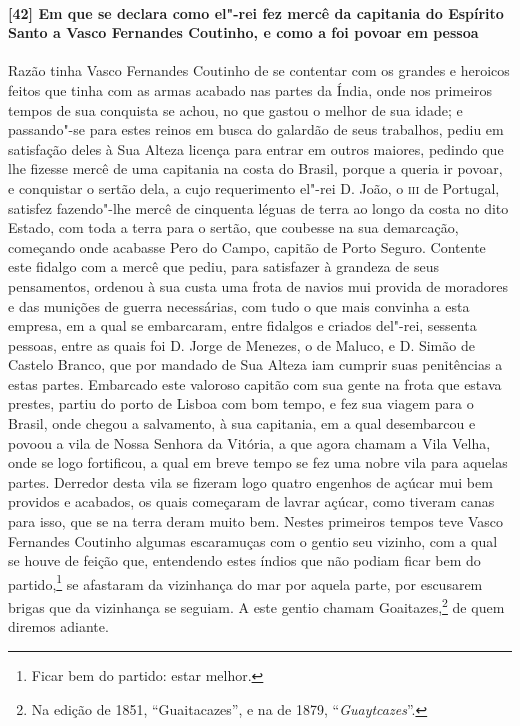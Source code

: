\begin{linenumbers}
\paragraph{[42] Em que se declara como el"-rei fez mercê da capitania do Espírito Santo a
Vasco Fernandes Coutinho, e como a foi povoar em pessoa} \quad
Razão tinha Vasco Fernandes Coutinho de se contentar com os grandes e heroicos feitos que
tinha com as armas acabado nas partes da Índia, onde nos primeiros tempos de sua conquista
se achou, no que gastou o melhor de sua idade; e passando"-se para estes reinos em busca do
galardão de seus trabalhos, pediu em satisfação deles à Sua Alteza licença para entrar em
outros maiores, pedindo que lhe fizesse mercê de uma capitania na costa do Brasil, porque
a queria ir povoar, e conquistar o sertão dela, a cujo requerimento el"-rei D. João, o
\textsc{iii} de Portugal, satisfez fazendo"-lhe mercê de cinquenta léguas de terra ao longo
da costa no dito Estado, com toda a terra para o sertão, que coubesse na sua demarcação,
começando onde acabasse Pero do Campo, capitão de Porto Seguro. Contente este fidalgo com
a mercê que pediu, para satisfazer à grandeza de seus pensamentos, ordenou à sua custa uma
frota de navios mui provida de moradores e das munições de guerra necessárias, com tudo o
que mais convinha a esta empresa, em a qual se embarcaram, entre fidalgos e criados
del"-rei, sessenta pessoas, entre as quais foi D. Jorge de Menezes, o de Maluco, e D. Simão
de Castelo Branco, que por mandado de Sua Alteza iam cumprir suas penitências a estas
partes. Embarcado este valoroso capitão com sua gente na frota que estava prestes, partiu
do porto de Lisboa com bom tempo, e fez sua viagem para o Brasil, onde chegou a
salvamento, à sua capitania, em a qual desembarcou e povoou a vila de Nossa Senhora da
Vitória, a que agora chamam a Vila Velha, onde se logo fortificou, a qual em breve tempo
se fez uma nobre vila para aquelas partes. Derredor desta vila se fizeram logo quatro
engenhos de açúcar mui bem providos e acabados, os quais começaram de lavrar açúcar, como
tiveram canas para isso, que se na terra deram muito bem. Nestes primeiros tempos teve
Vasco Fernandes Coutinho algumas escaramuças com o gentio seu vizinho, com a qual se houve
de feição que, entendendo estes índios que não podiam ficar bem do partido,\footnote{ Ficar
bem do partido: estar melhor.} se afastaram da vizinhança do mar por aquela parte, por
escusarem brigas que da vizinhança se seguiam. A este gentio chamam Goaitazes,\footnote{ Na
edição de 1851, ``Guaitacazes'', e na de 1879, ``\textit{Guaytcazes}''.} de quem diremos
adiante.


\end{linenumbers}

